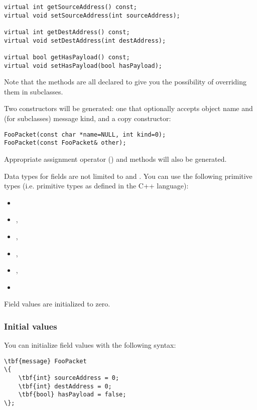 \begin{verbatim}
virtual int getSourceAddress() const;
virtual void setSourceAddress(int sourceAddress);

virtual int getDestAddress() const;
virtual void setDestAddress(int destAddress);

virtual bool getHasPayload() const;
virtual void setHasPayload(bool hasPayload);
\end{verbatim}

Note that the methods are all declared  to give you the possibility
of overriding them in subclasses.

Two constructors will be generated: one that optionally accepts object name and
(for  subclasses) message kind, and a copy constructor:

\begin{verbatim}
FooPacket(const char *name=NULL, int kind=0);
FooPacket(const FooPacket& other);
\end{verbatim}

Appropriate assignment operator () and  methods will
also be generated.

Data types for fields are not limited to  and . You can use the
following primitive types (i.e. primitive types as defined in the C++ language):

\begin{itemize}
   \item {}
   \item {}, 
   \item {}, 
   \item {}, 
   \item {}, 
   \item {}
\end{itemize}

Field values are initialized to zero.


\subsubsection{Initial values}

You can initialize field values with the following syntax:

\begin{Verbatim}[commandchars=\\\{\}]
\tbf{message} FooPacket
\{
    \tbf{int} sourceAddress = 0;
    \tbf{int} destAddress = 0;
    \tbf{bool} hasPayload = false;
\};
\end{Verbatim}

